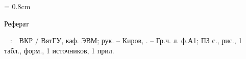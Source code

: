 
{

\topskip = 0.8cm
\begin{center}
	Реферат
\end{center}

\vspace{1em}

\authorwithinitials\
\topic
:\
\mbox{\tpga}\
ВКР / ВятГУ, каф. ЭВМ; рук.
\supervisor – Киров, \the\year. –
Гр.ч. \numberofposters л. ф.А1;
ПЗ
\total{page} с.,
 рис.,
1 табл.,
 форм.,
1 источников,
1 прил.

\vspace{1.5em}


\vspace{1.5em}

 {
	
}

}
